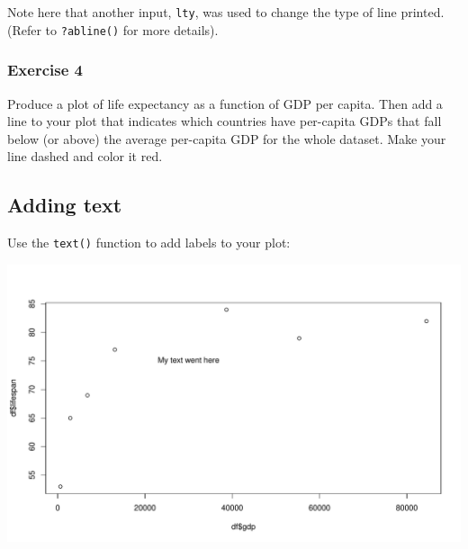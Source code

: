 \documentclass[
]{book}
\newenvironment{Shaded}{\begin{snugshade}}{\end{snugshade}}
\newcommand{\DataTypeTok}[1]{\textcolor[rgb]{0.13,0.29,0.53}{#1}}
\newcommand{\DecValTok}[1]{\textcolor[rgb]{0.00,0.00,0.81}{#1}}
\newcommand{\KeywordTok}[1]{\textcolor[rgb]{0.13,0.29,0.53}{\textbf{#1}}}
\newcommand{\NormalTok}[1]{#1}
\newcommand{\OperatorTok}[1]{\textcolor[rgb]{0.81,0.36,0.00}{\textbf{#1}}}
\newcommand{\StringTok}[1]{\textcolor[rgb]{0.31,0.60,0.02}{#1}}
\begin{document}
Note here that another input, \texttt{lty}, was used to change the type of line printed. (Refer to \texttt{?abline()} for more details).

\hypertarget{exercise-4-1}{%
\subsubsection*{Exercise 4}\label{exercise-4-1}}

Produce a plot of life expectancy as a function of GDP per capita. Then add a line to your plot that indicates which countries have per-capita GDPs that fall below (or above) the average per-capita GDP for the whole dataset. Make your line dashed and color it red.

\hypertarget{adding-text}{%
\subsection*{Adding text}\label{adding-text}}

Use the \texttt{text()} function to add labels to your plot:

\begin{Shaded}
\end{Shaded}

\includegraphics{figures/unnamed-chunk-122-1.pdf}
\end{document}
